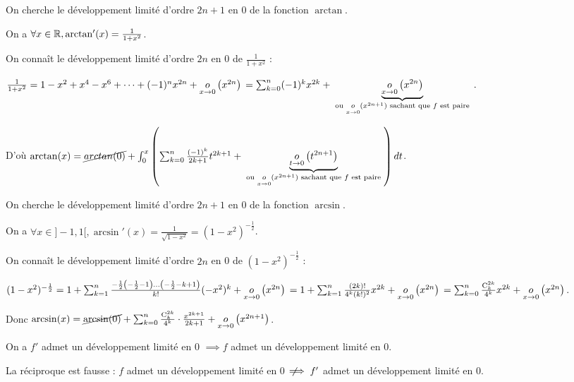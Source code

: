 \documentclass[12pt, a4paper]{report}
\begin{document}
\begin{example}
    \begin{outline}
        \1 On cherche le développement limité d'ordre $2n+1$ en 0 de la fonction $\arctan$.

        \2 On a $\forall x \in\mathbb{R}, \arctan'(x)=\frac{1}{1+x^2}$.

        \2 On connaît le développement limité d'ordre $2n$ en 0 de $\frac{1}{1+x^2}$ :

        \2 $\frac{1}{1+x^2} = 1 - x^2 + x^4 - x^6 + \dots + (-1)^n x^{2n} + \underset{x\to0}{o}\left(x^{2n}\right)\\=\sum_{k=0}^{n} (-1)^k x^{2k} + \underbrace{\underset{x\to0}{o}\left(x^{2n}\right)}_{\text{ ou } \underset{x\to0}{o}\left(x^{2n+1}\right) \text{ sachant que } f \text{ est paire }}.$

        \2 D'où $\arctan(x) = \cancel{arctan(0)} + \int_0^x \left(\sum_{k=0}^{n} \frac{(-1)^k}{2k+1} t^{2k+1} + \underbrace{\underset{t\to0}{o}\left(t^{2n+1}\right)}_{\text{ ou } \underset{x\to0}{o}\left(x^{2n+1}\right)\\\text{ sachant que } f \text{ est paire }}\right) dt$.

        \1 On cherche le développement limité d'ordre $2n+1$ en 0 de la fonction $\arcsin$.

        \2 On a $\forall x \in ]-1,1[, \arcsin'(x)=\frac{1}{\sqrt{1-x^2}}=(1-x^2)^{-\frac{1}{2}}$.

        \2 On connaît le développement limité d'ordre $2n$ en 0 de $(1-x^2)^{-\frac{1}{2}}$ :

        \2 $(1-x^2)^{-\frac{1}{2}} = 1 + \sum_{k=1}^{n}\frac{-\frac12\left(-\frac12 - 1\right)\dots\left(-\frac12 - k + 1\right)}{k!}(-x^2)^k + \underset{x\to0}{o}\left(x^{2n}\right)\\= 1+ \sum_{k=1}^{n} \frac{\left(2k\right)!}{4^k (k!)^2} x^{2k} + \underset{x\to0}{o}\left(x^{2n}\right)\\=\sum_{k=0}^{n}\frac{\mathrm{C}_{k}^{2k}}{4^k}x^{2k}+\underset{x\to0}{o}\left(x^{2n}\right)$.

        \2 Donc $\arcsin(x) = \cancel{\arcsin(0)} + \sum_{k=0}^{n}\frac{\mathrm{C}_{k}^{2k}}{4^k} \cdot \frac{x^{2k+1}}{2k+1} + \underset{x\to0}{o}\left(x^{2n+1}\right)$.
    \end{outline}
\end{example}

\begin{remark}
    On a $f'$ admet un développement limité en 0 $\implies f$ admet un développement limité en 0.

    La réciproque est fausse : $f$ admet un développement limité en 0 $\;\not\!\!\!\implies f'$ admet un développement limité en 0.
\end{remark}
\end{document}
